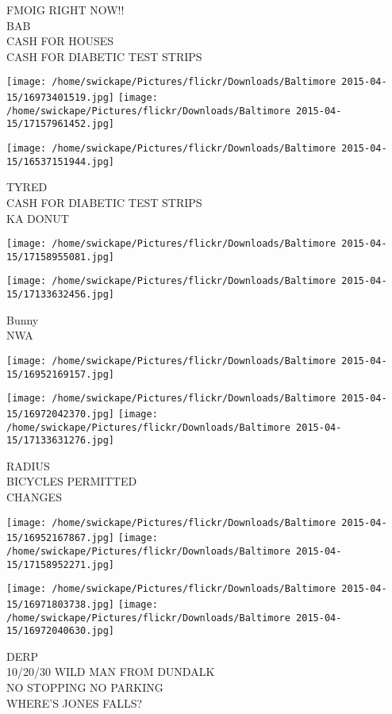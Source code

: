 \documentclass[10pt,letterpaper]{article}
\begin{document}
FMOIG RIGHT NOW!!\\
BAB\\
CASH FOR HOUSES\\
CASH FOR DIABETIC TEST STRIPS
\pagebreak

\texttt{[image: /home/swickape/Pictures/flickr/Downloads/Baltimore 2015-04-15/16973401519.jpg]}
\texttt{[image: /home/swickape/Pictures/flickr/Downloads/Baltimore 2015-04-15/17157961452.jpg]}

\texttt{[image: /home/swickape/Pictures/flickr/Downloads/Baltimore 2015-04-15/16537151944.jpg]}

TYRED\\
CASH FOR DIABETIC TEST STRIPS\\
KA DONUT
\pagebreak

\texttt{[image: /home/swickape/Pictures/flickr/Downloads/Baltimore 2015-04-15/17158955081.jpg]}

\vspace{0.25in}
\texttt{[image: /home/swickape/Pictures/flickr/Downloads/Baltimore 2015-04-15/17133632456.jpg]}

Bunny\\
NWA
\pagebreak

\texttt{[image: /home/swickape/Pictures/flickr/Downloads/Baltimore 2015-04-15/16952169157.jpg]}

\vspace{0.25in}
\texttt{[image: /home/swickape/Pictures/flickr/Downloads/Baltimore 2015-04-15/16972042370.jpg]}
\texttt{[image: /home/swickape/Pictures/flickr/Downloads/Baltimore 2015-04-15/17133631276.jpg]}

RADIUS\\
BICYCLES PERMITTED\\
CHANGES
\pagebreak

\texttt{[image: /home/swickape/Pictures/flickr/Downloads/Baltimore 2015-04-15/16952167867.jpg]}
\texttt{[image: /home/swickape/Pictures/flickr/Downloads/Baltimore 2015-04-15/17158952271.jpg]}

\texttt{[image: /home/swickape/Pictures/flickr/Downloads/Baltimore 2015-04-15/16971803738.jpg]}
\texttt{[image: /home/swickape/Pictures/flickr/Downloads/Baltimore 2015-04-15/16972040630.jpg]}

DERP\\
10/20/30 WILD MAN FROM DUNDALK\\
NO STOPPING NO PARKING\\
WHERE'S JONES FALLS?
\pagebreak
\end{document}
